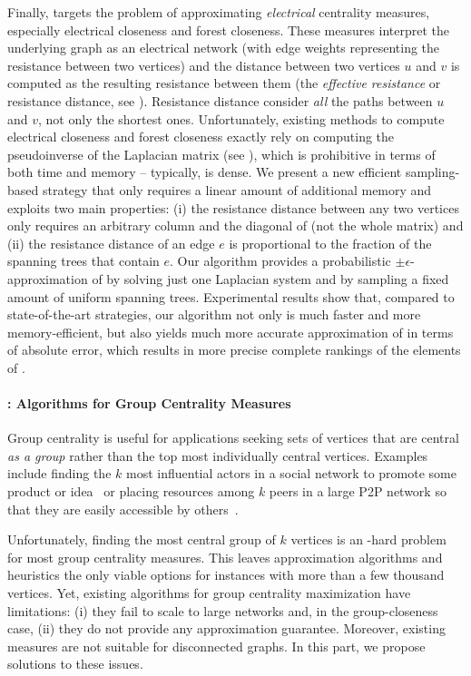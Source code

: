 Finally,  targets the problem of approximating
\emph{electrical} centrality measures, especially electrical closeness and
forest closeness. These measures interpret the underlying graph as an
electrical network (with edge weights representing the resistance between
two vertices) and the distance between two vertices $u$ and $v$ is
computed as the resulting resistance between them (\ie the \emph{effective
resistance} or resistance distance, see ).
Resistance distance  consider \emph{all} the paths
between $u$ and $v$, not only the shortest ones.
%
Unfortunately, existing methods to compute electrical closeness and forest
closeness exactly rely on computing the pseudoinverse \Linv of the Laplacian
matrix \Lapl (see ), which is prohibitive in terms of
both time and memory -- typically, \Linv is dense.
We present a new efficient sampling-based strategy that only requires a linear
amount of additional memory and exploits two main properties:
(i) the resistance distance between any two vertices only requires an arbitrary
column and the diagonal of \Linv (not the whole matrix) and (ii) the resistance
distance of an edge $e$ is proportional
to the fraction of the spanning trees that contain $e$. Our algorithm
provides a probabilistic $\pm\epsilon$-approximation of
\diag{\Linv} by solving just one Laplacian system
and by sampling a fixed amount of uniform spanning trees.
Experimental results show that, compared to state-of-the-art strategies,
our algorithm not only is much faster and more memory-efficient, but also
yields much more accurate approximation of \diag{\Linv} in terms of absolute
error, which results in more precise complete rankings of the elements
of \diag{\Linv}.


\paragraph{: Algorithms for Group Centrality Measures}
%
Group centrality is useful for applications seeking sets of vertices that are
central \emph{as a group} rather than the top most individually central
vertices. Examples include finding the $k$ most influential actors in a social
network to promote some product or idea~\cite{DBLP:journals/toc/KempeKT15} or
placing resources among $k$ peers in a large P2P network so that they are
easily accessible by others~\cite{DBLP:journals/pe/GkantsidisMS06}.

Unfortunately, finding the most central group of $k$ vertices is an \np-hard
problem for most group centrality measures. This leaves approximation
algorithms and heuristics the only viable options for instances with more than
a few thousand vertices. Yet, existing algorithms for group centrality
maximization have limitations: (i) they fail to scale to large networks and, in
the group-closeness case, (ii) they do not provide any approximation guarantee.
Moreover, existing measures are not suitable for disconnected graphs. In this
part, we propose solutions to these issues.

